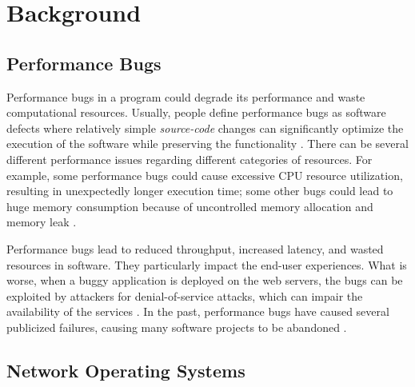 \section{Background}
\label{s:background}

\subsection{Performance Bugs}
\label{s:background-bug}
Performance bugs in a program could degrade its performance and waste computational resources.
%
Usually, people define performance bugs as software defects where relatively simple \emph{source-code} changes can significantly optimize the execution of the software while preserving the functionality \cite{perfbugstudy, killian2010finding, s2e}.
%
There can be several different performance issues regarding different categories of resources.
%
For example, some performance bugs could cause excessive CPU resource utilization, resulting in unexpectedly longer execution time; 
%
some other bugs could lead to huge memory consumption because of uncontrolled memory allocation and memory leak \cite{wen2020memlock}.
%

Performance bugs lead to reduced throughput, increased latency, and wasted resources in software.
%
They particularly impact the end-user experiences.
%
What is worse, when a buggy application is deployed on the web servers, the bugs can be exploited by attackers for denial-of-service attacks, which can impair the availability of the services \cite{rampart}.
%
In the past, performance bugs have caused several publicized failures, causing many software projects to be abandoned \cite{perfbugstudy, lessons}.

\subsection{Network Operating Systems}
\label{s:background-nos}

